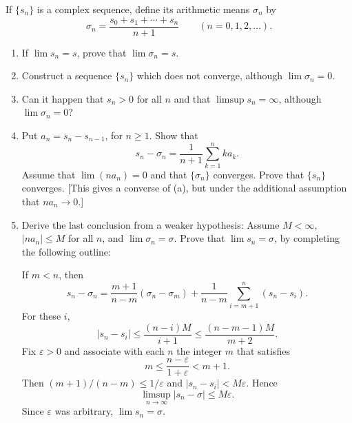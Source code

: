 \documentclass[main.tex]{subfiles}
\begin{document}
If $\{s_{n}\}$ is a complex sequence, define its arithmetic means $\sigma_{n}$ by
\[
\sigma_{n} = \frac{s_{0} + s_{1} + \cdots + s_{n}}{n+1} \qquad (n = 0, 1, 2, \ldots).
\]
\begin{enumerate}
  \item If $\lim s_{n} = s$, prove that $\lim \sigma_{n} = s$.
  \item Construct a sequence $\{s_{n}\}$ which does not converge, although $\lim \sigma_{n} = 0$.
  \item Can it happen that $s_{n} > 0$ for all $n$ and that $\limsup s_{n} = \infty$, although $\lim \sigma_{n} = 0$?
  \item Put $a_{n} = s_{n} - s_{n-1}$, for $n \geq 1$. Show that
  \[
  s_{n} - \sigma_{n} = \frac{1}{n+1} \sum_{k=1}^{n} k a_{k}.
  \]
  Assume that $\lim (n a_{n}) = 0$ and that $\{\sigma_{n}\}$ converges. Prove that $\{s_{n}\}$ converges. [This gives a converse of (a), but under the additional assumption that $n a_{n} \to 0$.]
  \item Derive the last conclusion from a weaker hypothesis: Assume $M < \infty$, $|n a_{n}| \leq M$ for all $n$, and $\lim \sigma_{n} = \sigma$. Prove that $\lim s_{n} = \sigma$, by completing the following outline:

  If $m < n$, then
  \[
  s_{n} - \sigma_{n} = \frac{m+1}{n-m}(\sigma_{n} - \sigma_{m}) + \frac{1}{n-m} \sum_{i=m+1}^{n} (s_{n} - s_{i}).
  \]
  For these $i$,
  \[
  |s_{n} - s_{i}| \leq \frac{(n-i)M}{i+1} \leq \frac{(n-m-1)M}{m+2}.
  \]
  Fix $\varepsilon > 0$ and associate with each $n$ the integer $m$ that satisfies
  \[
  m \leq \frac{n - \varepsilon}{1 + \varepsilon} < m + 1.
  \]
  Then $(m+1)/(n-m) \leq 1/\varepsilon$ and $|s_{n} - s_{i}| < M\varepsilon$. Hence
  \[
  \limsup_{n\to\infty} |s_{n} - \sigma| \leq M\varepsilon.
  \]
  Since $\varepsilon$ was arbitrary, $\lim s_{n} = \sigma$.
\end{enumerate}
\end{document}
